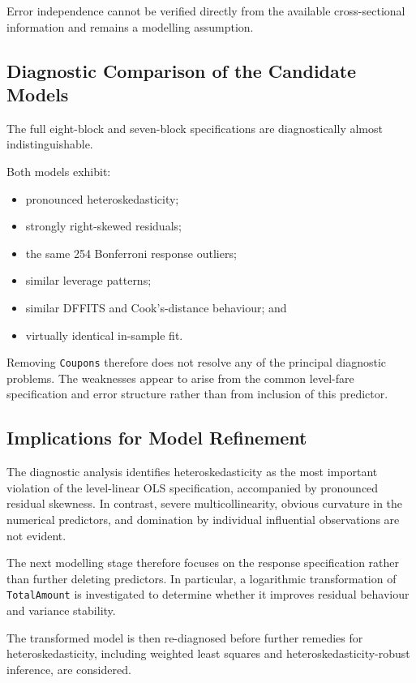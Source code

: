 \documentclass[11pt,a4paper]{article}
\begin{document}
Error independence cannot be verified directly from the available cross-sectional information and remains a modelling assumption.

\subsection{Diagnostic Comparison of the Candidate Models}

The full eight-block and seven-block specifications are diagnostically almost indistinguishable.

Both models exhibit:

\begin{itemize}
    \item pronounced heteroskedasticity;
    \item strongly right-skewed residuals;
    \item the same 254 Bonferroni response outliers;
    \item similar leverage patterns;
    \item similar DFFITS and Cook's-distance behaviour; and
    \item virtually identical in-sample fit.
\end{itemize}

Removing \texttt{Coupons} therefore does not resolve any of the principal diagnostic problems. The weaknesses appear to arise from the common level-fare specification and error structure rather than from inclusion of this predictor.

\subsection{Implications for Model Refinement}

The diagnostic analysis identifies heteroskedasticity as the most important violation of the level-linear OLS specification, accompanied by pronounced residual skewness. In contrast, severe multicollinearity, obvious curvature in the numerical predictors, and domination by individual influential observations are not evident.

The next modelling stage therefore focuses on the response specification rather than further deleting predictors. In particular, a logarithmic transformation of \texttt{TotalAmount} is investigated to determine whether it improves residual behaviour and variance stability.

The transformed model is then re-diagnosed before further remedies for heteroskedasticity, including weighted least squares and heteroskedasticity-robust inference, are considered.
\end{document}
